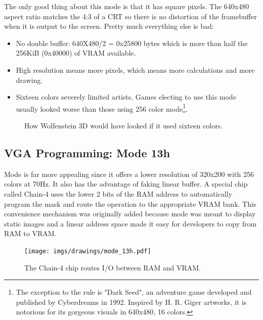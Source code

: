 \documentclass[book.tex]{subfiles}
\begin{document}
The only good thing about this mode is that it has square pixels. The 640x480 aspect ratio matches the 4:3 of a CRT so there is no distortion of the framebuffer when it is output to the screen. Pretty much everything else is bad:\\
\begin{itemize}
\item No double buffer: 640X480/2 = 0x25800 bytes which is more than half the 256KiB (0x40000) of VRAM available.
\item High resolution means more pixels, which means more calculations and more drawing.
\item Sixteen colors severely limited artists. Games electing to use this mode usually looked worse than those using 256 color mode\footnote{The exception to the rule is "Dark Seed", an adventure game developed and published by Cyberdreams in 1992. Inspired by H. R. Giger artworks, it is notorious for its gorgeous visuals in 640x480, 16 colors.}.
\end{itemize}

 \begin{figure}[H]
\centering
 \caption{How Wolfenstein 3D would have looked if it used sixteen colors.}
 \label{wolf16}
\end{figure}




 \pagebreak
  \subsection{VGA Programming: Mode 13h}
  Mode  is far more appealing since it offers a lower resolution of 320x200 with 256 colors at 70Hz. It also has the advantage of faking linear buffer. A special chip called Chain-4 uses the lower 2 bits of the RAM address to automatically program the mask and route the operation to the appropriate VRAM bank. This convenience mechanism was originally added because mode  was meant to display static images and a linear address space made it easy for developers to copy from RAM to VRAM.\\
  \par
 \begin{figure}[H]
\centering
      \texttt{[image: imgs/drawings/mode\_13h.pdf]}
      \caption{The Chain-4 chip routes I/O between RAM and VRAM.}
\end{figure}
\par
\end{document}
